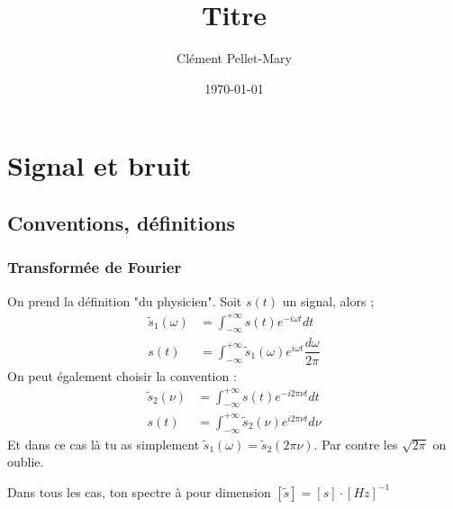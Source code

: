 \documentclass[a4paper]{report}
\title{Titre}
\author{Clément Pellet-Mary}
\date\today
\begin{document}
\tableofcontents
\chapter{Signal et bruit}
  \section{Conventions, définitions}
  \subsection{Transformée de Fourier}
  On prend la définition "du physicien". Soit $s(t)$ un signal, alors ; 
  \begin{align}
  \tilde{s}_1(\omega)&=\int_{-\infty}^{+\infty} s(t) e^{-i\omega t} dt \\
  s(t)&=\int_{-\infty}^{+\infty}\tilde{s}_1(\omega) e^{i\omega t} \dfrac{d\omega}{2\pi}
  \end{align}
  On peut également choisir la convention :
  \begin{align}
  \tilde{s}_2(\nu)&=\int_{-\infty}^{+\infty} s(t) e^{-i2\pi \nu t} dt \\
  s(t)&=\int_{-\infty}^{+\infty}\tilde{s}_2(\nu) e^{i2\pi \nu t} d\nu
  \end{align}
  Et dans ce cas là tu as simplement $\tilde{s}_1(\omega)=\tilde{s}_2(2\pi \nu)$. Par contre les $\sqrt{2\pi}$ on oublie.
  
  Dans tous les cas, ton spectre à pour dimension $[\tilde{s}]=[s]\cdot[Hz]^{-1}$
\end{document}
